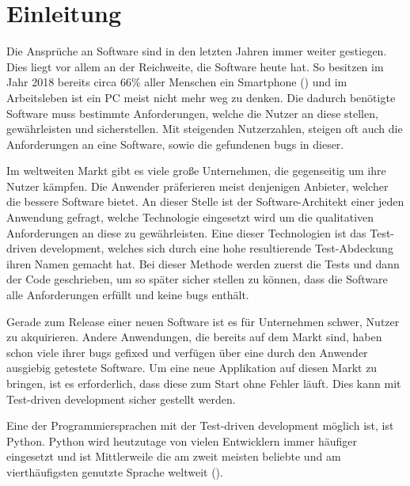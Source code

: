 \section*{Einleitung}\label{einleitung}

Die Ansprüche an Software sind in den letzten Jahren immer weiter gestiegen.
Dies liegt vor allem an der Reichweite, die Software heute hat. So besitzen
im Jahr 2018 bereits circa 66\% aller Menschen ein Smartphone
(\cite{FraukeSchobelt:Smartphone}) und im Arbeitsleben ist ein PC meist nicht
mehr weg zu denken. Die dadurch benötigte Software muss bestimmte
Anforderungen, welche die Nutzer an diese stellen, gewährleisten und
sicherstellen. Mit steigenden Nutzerzahlen, steigen oft auch die Anforderungen
an eine Software, sowie die gefundenen \Glspl{bug} in dieser.

Im weltweiten Markt gibt es viele große Unternehmen, die gegenseitig um ihre
Nutzer kämpfen. Die Anwender präferieren meist denjenigen Anbieter, welcher die
bessere Software bietet. An dieser Stelle ist der Software-Architekt einer
jeden Anwendung gefragt, welche Technologie eingesetzt wird um die qualitativen
Anforderungen an diese zu gewährleisten. Eine dieser Technologien ist das
Test-driven development, welches sich durch eine hohe resultierende
Test-Abdeckung ihren Namen gemacht hat. Bei dieser Methode werden zuerst die
Tests und dann der Code geschrieben, um so später sicher stellen zu können,
dass die Software alle Anforderungen erfüllt und keine \Glspl{bug} enthält.

Gerade zum Release einer neuen Software ist es für Unternehmen schwer, Nutzer
zu akquirieren. Andere Anwendungen, die bereits auf dem Markt sind, haben
schon viele ihrer \Glspl{bug} gefixed und verfügen über eine durch den
Anwender ausgiebig getestete Software. Um eine neue Applikation auf diesen
Markt zu bringen, ist es erforderlich, dass diese zum Start ohne Fehler läuft.
Dies kann mit Test-driven development sicher gestellt werden.

Eine der Programmiersprachen mit der Test-driven development möglich ist, ist
Python. Python wird heutzutage von vielen Entwicklern immer häufiger eingesetzt
und ist Mittlerweile die am zweit meisten beliebte und am vierthäufigsten
genutzte Sprache weltweit (\cite{stackoverflow:2019}).

